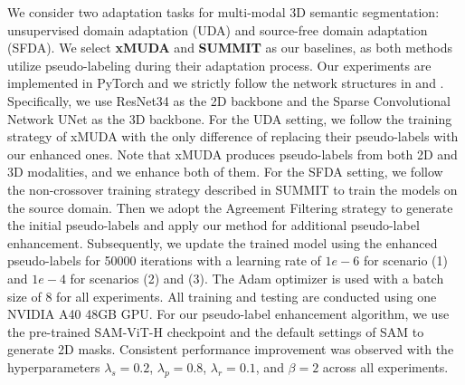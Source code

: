 We consider two adaptation tasks for multi-modal 3D semantic segmentation: unsupervised domain adaptation (UDA) and source-free domain adaptation (SFDA). We select \textbf{xMUDA}\cite{jaritz2020xmuda} and \textbf{SUMMIT}\cite{simons2023summit} as our baselines, as both methods utilize pseudo-labeling during their adaptation process. Our experiments are implemented in PyTorch and we strictly follow the network structures in \cite{jaritz2020xmuda} and \cite{simons2023summit}. Specifically, we use ResNet34 \cite{he2016deep} as the 2D backbone and the Sparse Convolutional Network UNet \cite{graham20183d} as the 3D backbone. For the UDA setting, we follow the training strategy of xMUDA \cite{jaritz2020xmuda} with the only difference of replacing their pseudo-labels with our enhanced ones. Note that xMUDA produces pseudo-labels from both 2D and 3D modalities, and we enhance both of them. For the SFDA setting, we follow the non-crossover training strategy described in SUMMIT \cite{simons2023summit} to train the models on the source domain. Then we adopt the Agreement Filtering strategy to generate the initial pseudo-labels and apply our method for additional pseudo-label enhancement. Subsequently, we update the trained model using the enhanced pseudo-labels for 50000 iterations with a learning rate of $1e-6$ for scenario (1) and $1e-4$ for scenarios (2) and (3). The Adam optimizer \cite{kingma2014adam}  is used with a batch size of 8 for all experiments. All training and testing are conducted using one NVIDIA A40 48GB GPU. For our pseudo-label enhancement algorithm, we use the pre-trained SAM-ViT-H checkpoint and the default settings of SAM to generate 2D masks. Consistent performance improvement was observed with the hyperparameters $\lambda_s=0.2$, $\lambda_p=0.8$, $\lambda_r=0.1$, and $\beta=2$ across all experiments.








